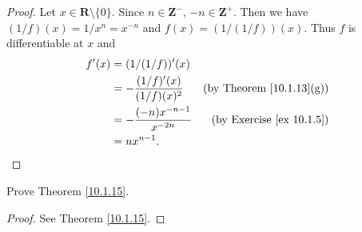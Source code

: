 \begin{proof}
    Let \(x \in \mathbf{R} \setminus \{0\}\).
    Since \(n \in \mathbf{Z}^-\), \(-n \in \mathbf{Z}^+\).
    Then we have \((1 / f)(x) = 1 / x^n = x^{-n}\) and \(f(x) = (1 / (1 / f))(x)\).
    Thus \(f\) is differentiable at \(x\) and
    \begin{align*}
        f'(x) & = (1 / (1 / f))'(x)                                                        \\
              & = -\frac{(1 / f)'(x)}{(1 / f)(x)^2} & \text{(by Theorem \ref{10.1.13}(g))} \\
              & = -\frac{(-n) x^{-n - 1}}{x^{-2n}}  & \text{(by Exercise \ref{ex 10.1.5})} \\
              & = n x^{n - 1}.
    \end{align*}
\end{proof}

\begin{exercise}\label{ex 10.1.7}
    Prove Theorem \ref{10.1.15}.
\end{exercise}

\begin{proof}
    See Theorem \ref{10.1.15}.
\end{proof}